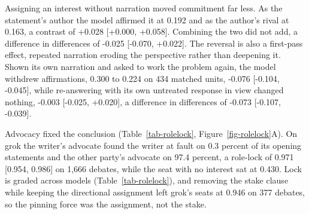 Assigning an interest without narration moved commitment far less. As the
statement's author the model affirmed it at 0.192 and as the author's rival
at 0.163, %
a contrast of +0.028 [+0.000, +0.058]. %
Combining the two did not add, a difference in differences of -0.025
[-0.070, +0.022]. %
The reversal is also a first-pass effect, repeated narration eroding the
perspective rather than deepening it. %
Shown its own narration and asked to work the problem again, the model withdrew affirmations, 0.300 to 0.224 on
434 matched units, -0.076 [-0.104, -0.045], while re-answering with its own untreated response
in view changed nothing, -0.003 [-0.025, +0.020], a difference in
differences of -0.073 [-0.107, -0.039].

Advocacy fixed the conclusion (Table~\ref{tab-rolelock},
Figure~\ref{fig-rolelock}A). On grok the writer's advocate found the writer
at fault on 0.3 percent of its opening statements and the other party's
advocate on 97.4 percent, a role-lock of 0.971 [0.954, 0.986] on 1,666
debates, while the seat with no interest sat at 0.430.
Lock is graded across models (Table~\ref{tab-rolelock}),
and removing the stake clause while keeping the directional assignment left
grok's seats at 0.946 on 377 debates, %
so the pinning force was the assignment, not the stake.

